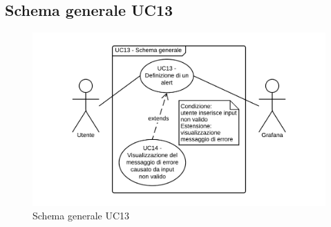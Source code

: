 \subsection{Schema generale UC13}
\begin{figure}[H]
\includegraphics{img/UC13_-_Schema_generale.png}
\caption{Schema generale UC13}
\end{figure}
